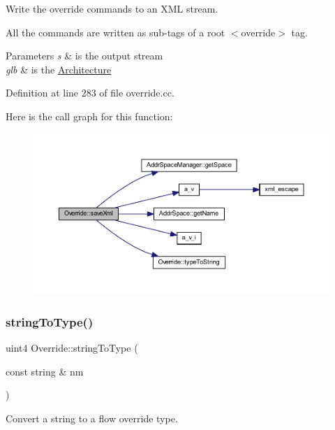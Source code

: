 Write the override commands to an X\+ML stream. 

All the commands are written as sub-\/tags of a root $<$override$>$ tag. 
\begin{DoxyParams}{Parameters}
{\em s} & is the output stream \\
\hline
{\em glb} & is the \mbox{\hyperlink{class_architecture}{Architecture}} \\
\hline
\end{DoxyParams}


Definition at line 283 of file override.\+cc.

Here is the call graph for this function\+:
\nopagebreak
\begin{figure}[H]
\begin{center}
\leavevmode
\includegraphics[width=350pt]{class_override_ab983057b1943546a6ed8ef1b2bbd3627_cgraph}
\end{center}
\end{figure}
\mbox{\label{class_override_a7456d7f93fb0f67cdebb42ac1bca5c46}} 
\subsubsection{\texorpdfstring{stringToType()}{stringToType()}}
{\footnotesize\ttfamily uint4 Override\+::string\+To\+Type (\begin{DoxyParamCaption}\item[{const string \&}]{nm }\end{DoxyParamCaption})\hspace{0.3cm}{\ttfamily [static]}}



Convert a string to a flow override type. 



